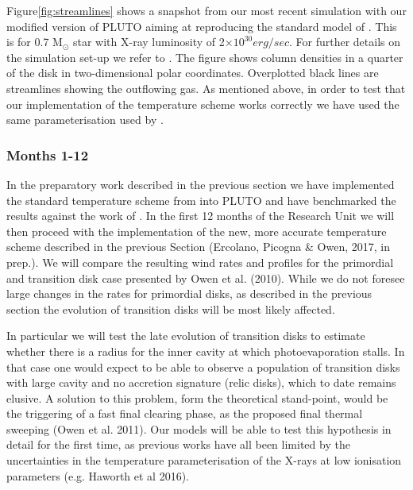 \documentclass[10pt,fleqn,twoside]{article}
\begin{document}
Figure\ref{fig:streamlines} shows a snapshot from our most recent simulation
with our modified version of PLUTO 
aiming at reproducing the standard model of
\citet{2010MNRAS.401.1415O}. This is for 0.7 M$_{\odot}$ star with
X-ray luminosity of 2$\times 10^{30} erg/sec$. For further details on
the simulation set-up we refer to \citet{2010MNRAS.401.1415O}. The
figure shows column densities in a quarter of the disk in
two-dimensional polar
coordinates. Overplotted black lines are streamlines showing the
outflowing gas. As mentioned above, in order to test that our implementation of the
temperature scheme works correctly we have used the same
parameterisation used by 
\citet{2010MNRAS.401.1415O}. 


\subsubsection{Months 1-12}
In the preparatory work described in the previous section we have
implemented the standard temperature scheme from 
\citet{2008ApJ...688..398E, 2009ApJ...699.1639E}
into PLUTO and have benchmarked the results against
the work of 
\citet{2010MNRAS.401.1415O}.
In the first 12 months of the Research
Unit we will then proceed with the implementation of the new, more accurate
temperature scheme described in the previous Section (Ercolano,
Picogna \& Owen, 2017, in prep.). We will compare the resulting
wind rates and profiles for the primordial and transition disk
case presented by Owen et al. (2010). While we do not foresee large
changes in the rates for primordial disks, as described in the
previous section the evolution of transition disks will be most 
likely affected. 

In particular we will test the late evolution of transition disks to
estimate whether there is a radius for the inner cavity at which
photoevaporation stalls. In that case one would expect to be able to
observe a population of transition disks with large cavity and no
accretion signature (relic disks), which to date remains elusive. A solution to this
problem, form the theoretical stand-point, would be the triggering of
a fast final clearing phase, as the proposed final thermal sweeping
(Owen et al. 2011). Our models will be able to test this hypothesis in
detail for the first time, as previous works have all been limited by
the uncertainties in the temperature parameterisation of the X-rays at
low ionisation parameters (e.g. Haworth et al 2016). 
\end{document}
